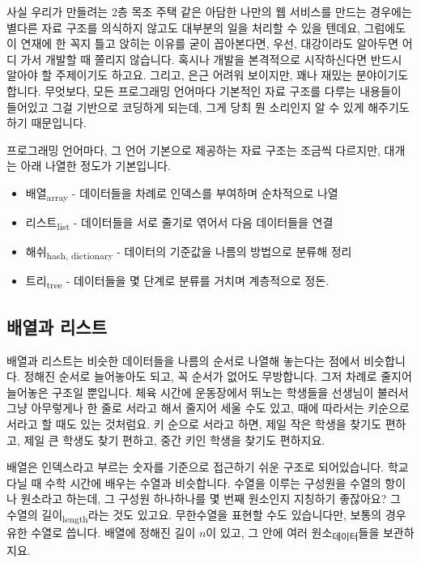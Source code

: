 \documentclass[11pt,a4paper]{article}
\newcommand{\sub}[1]{\textsubscript{#1}}
\begin{document}
사실 우리가 만들려는 2층 목조 주택 같은 아담한 나만의 웹 서비스를 만드는 경우에는 별다른 자료 구조를 의식하지 않고도 대부분의 일을 처리할 수 있을 텐데요, 그럼에도 이 연재에 한 꼭지 틀고 앉히는 이유를 굳이 꼽아본다면, 우선, 대강이라도 알아두면 어디 가서 개발할 때 쫄리지 않습니다. 혹시나 개발을 본격적으로 시작하신다면 반드시 알아야 할 주제이기도 하고요. 그리고, 은근 어려워 보이지만, 꽤나 재밌는 분야이기도 합니다. 무엇보다, 모든 프로그래밍 언어마다 기본적인 자료 구조를 다루는 내용들이 들어있고 그걸 기반으로 코딩하게 되는데, 그게 당최 뭔 소리인지 알 수 있게 해주기도 하기 때문입니다.

프로그래밍 언어마다, 그 언어 기본으로 제공하는 자료 구조는 조금씩 다르지만, 대개는 아래 나열한 정도가 기본입니다.

\begin{itemize}
\item{배열\sub{array}} - 데이터들을 차례로 인덱스를 부여하며 순차적으로 나열
\item{리스트\sub{list}} - 데이터들을 서로 줄기로 엮어서 다음 데이터들을 연결
\item{해쉬\sub{hash, dictionary}} - 데이터의 기준값을 나름의 방법으로 분류해 정리
\item{트리\sub{tree}} - 데이터들을 몇 단계로 분류를 거치며 계층적으로 정돈.
\end{itemize}

\subsection{배열과 리스트}

배열과 리스트는 비슷한 데이터들을 나름의 순서로 나열해 놓는다는 점에서 비슷합니다. 정해진 순서로 늘어놓아도 되고, 꼭 순서가 없어도 무방합니다. 그저 차례로 줄지어 늘어놓은 구조일 뿐입니다. 체육 시간에 운동장에서 뛰노는 학생들을 선생님이 불러서 그냥 아무렇게나 한 줄로 서라고 해서 줄지어 세울 수도 있고, 때에 따라서는 키순으로 서라고 할 때도 있는 것처럼요. 키 순으로 서라고 하면, 제일 작은 학생을 찾기도 편하고, 제일 큰 학생도 찾기 편하고, 중간 키인 학생을 찾기도 편하지요.

배열은 인덱스라고 부르는 숫자를 기준으로 접근하기 쉬운 구조로 되어있습니다. 학교 다닐 때 수학 시간에 배우는 수열과 비슷합니다. 수열을 이루는 구성원을 수열의 항이나 원소라고 하는데, 그 구성원 하나하나를 몇 번째 원소인지 지칭하기 좋잖아요? 그 수열의 길이\sub{length}라는 것도 있고요. 무한수열을 표현할 수도 있습니다만, 보통의 경우 유한 수열로 씁니다. 배열에 정해진 길이 $n$이 있고, 그 안에 여러 원소\sub{데이터}들을 보관하지요.
\end{document}

